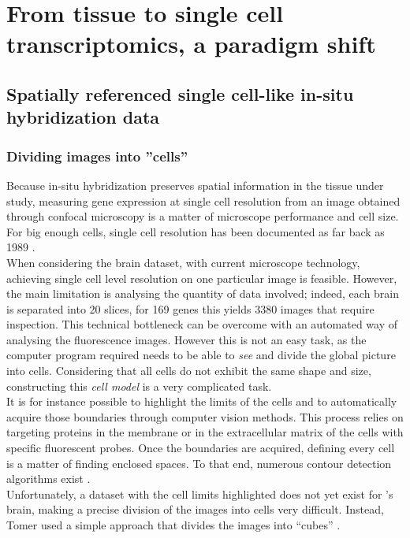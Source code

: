\chapter{From tissue to single cell transcriptomics, a paradigm shift}\label{ch:singlecell}
\section{Spatially referenced single cell-like in-situ hybridization data}\label{sec:single_cell_insitu}
  \subsection{Dividing images into ''cells''}
  Because in-situ hybridization preserves spatial information in the tissue under study, measuring gene expression at single cell resolution from an image obtained through confocal microscopy is a matter of microscope performance and cell size. For big enough cells, single cell resolution has been documented as far back as 1989 \cite{tautz89,poulsen93}.\\
  
  When considering the \platy{} brain dataset, with current microscope technology, achieving single cell level resolution on one particular image is feasible. However, the main limitation is analysing the quantity of data involved; indeed, each brain is separated into 20 slices, for 169 genes this yields 3380 images that require inspection. This technical bottleneck can be overcome with an automated way of analysing the fluorescence images. However this is not an easy task, as the computer program required needs to be able to \emph{see} and divide the global picture into cells. Considering that all cells do not exhibit the same shape and size, constructing this \emph{cell model} is a very complicated task.\\
  
  It is for instance possible to highlight the limits of the cells and to automatically acquire those boundaries through computer vision methods. This process relies on targeting proteins in the membrane or in the extracellular matrix of the cells with specific fluorescent probes. Once the boundaries are acquired, defining every cell is a matter of finding enclosed spaces. To that end, numerous contour detection algorithms exist \cite{li95,fan01,arbelaez11}.\\
  
  Unfortunately, a dataset with the cell limits highlighted does not yet exist for \platy{}'s brain, making a precise division of the images into cells very difficult. Instead, Tomer used a simple approach that divides the images into ``cubes'' \cite{Tomer10}.


